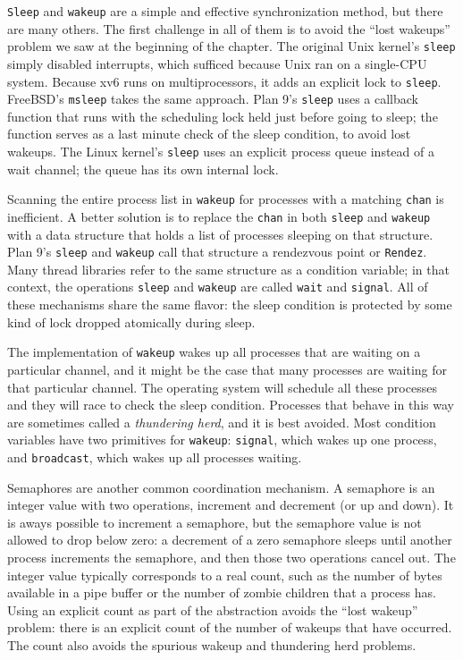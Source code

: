 \lstinline{Sleep}
and
\lstinline{wakeup}
are a simple and effective synchronization method,
but there are many others.
The first challenge in all of them is to
avoid the ``lost wakeups'' problem we saw at the
beginning of the chapter.
The original Unix kernel's
\lstinline{sleep}
simply disabled interrupts,
which sufficed because Unix ran on a single-CPU system.
Because xv6 runs on multiprocessors,
it adds an explicit lock to
\lstinline{sleep}.
FreeBSD's
\lstinline{msleep}
takes the same approach.
Plan 9's 
\lstinline{sleep}
uses a callback function that runs with the scheduling
lock held just before going to sleep;
the function serves as a last minute check
of the sleep condition, to avoid lost wakeups.
The Linux kernel's
\lstinline{sleep}
uses an explicit process queue instead of
a wait channel; the queue has its own internal lock.

Scanning the entire process list in
\lstinline{wakeup}
for processes with a matching
\lstinline{chan}
is inefficient.  A better solution is to
replace the
\lstinline{chan}
in both
\lstinline{sleep}
and
\lstinline{wakeup}
with a data structure that holds
a list of processes sleeping on that structure.
Plan 9's
\lstinline{sleep}
and
\lstinline{wakeup}
call that structure a rendezvous point or
\lstinline{Rendez}.
Many thread libraries refer to the same
structure as a condition variable;
in that context, the operations
\lstinline{sleep}
and
\lstinline{wakeup}
are called
\lstinline{wait}
and
\lstinline{signal}.
All of these mechanisms share the same
flavor: the sleep condition is protected by
some kind of lock dropped atomically during sleep.

The implementation of
\lstinline{wakeup}
wakes up all processes that are waiting on a particular channel, and it might be
the case that many processes are waiting for that particular channel.   The
operating system will schedule all these processes and they will race to check
the sleep condition.  Processes that behave in this way are sometimes called a
\textit{thundering herd},
and it is best avoided.
Most condition variables have two primitives for
\lstinline{wakeup}:
\lstinline{signal},
which wakes up one process, and
\lstinline{broadcast},
which wakes up all processes waiting.

Semaphores are another common coordination
mechanism.
A semaphore is an integer value with two operations,
increment and decrement (or up and down).
It is aways possible to increment a semaphore,
but the semaphore value is not allowed to drop below zero:
a decrement of a zero semaphore sleeps until
another process increments the semaphore,
and then those two operations cancel out.
The integer value typically corresponds to a real
count, such as the number of bytes available in a pipe buffer
or the number of zombie children that a process has.
Using an explicit count as part of the abstraction
avoids the ``lost wakeup'' problem:
there is an explicit count of the number
of wakeups that have occurred.
The count also avoids the spurious wakeup
and thundering herd problems.

